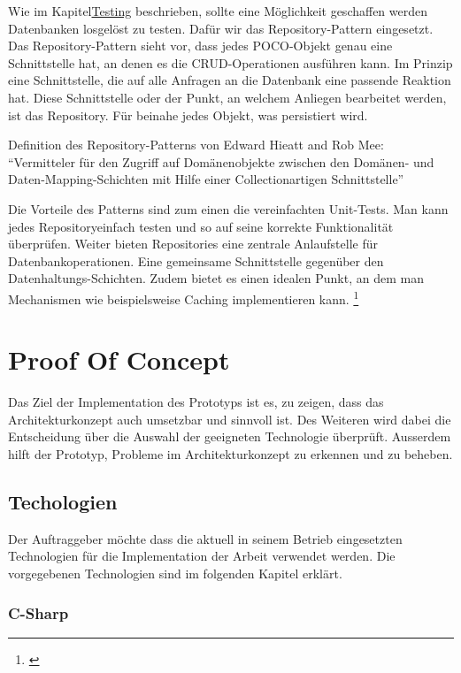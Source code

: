 Wie im Kapitel\protect\hyperlink{testing-1}{Testing} beschrieben, sollte
eine Möglichkeit geschaffen werden Datenbanken losgelöst zu testen.
Dafür wir das Repository-Pattern eingesetzt. Das Repository-Pattern
sieht vor, dass jedes POCO-Objekt genau eine Schnittstelle hat, an denen
es die CRUD-Operationen ausführen kann. Im Prinzip eine Schnittstelle,
die auf alle Anfragen an die Datenbank eine passende Reaktion hat. Diese
Schnittstelle oder der Punkt, an welchem Anliegen bearbeitet werden, ist
das Repository. Für beinahe jedes Objekt, was persistiert wird.

Definition des Repository-Patterns von Edward Hieatt and Rob Mee:
``Vermitteler für den Zugriff auf Domänenobjekte zwischen den Domänen-
und Daten-Mapping-Schichten mit Hilfe einer Collectionartigen
Schnittstelle''

Die Vorteile des Patterns sind zum einen die vereinfachten Unit-Tests.
Man kann jedes Repositoryeinfach testen und so auf seine korrekte
Funktionalität überprüfen. Weiter bieten Repositories eine zentrale
Anlaufstelle für Datenbankoperationen. Eine gemeinsame Schnittstelle
gegenüber den Datenhaltungs-Schichten. Zudem bietet es einen idealen
Punkt, an dem man Mechanismen wie beispielsweise Caching implementieren
kann. \footnote{\autocite{repository}}

\chapter{Proof Of Concept}\label{proof-of-concept}

Das Ziel der Implementation des Prototyps ist es, zu zeigen, dass das
Architekturkonzept auch umsetzbar und sinnvoll ist. Des Weiteren wird
dabei die Entscheidung über die Auswahl der geeigneten Technologie
überprüft. Ausserdem hilft der Prototyp, Probleme im Architekturkonzept
zu erkennen und zu beheben.

\section{Techologien}\label{techologien}

Der Auftraggeber möchte dass die aktuell in seinem Betrieb eingesetzten
Technologien für die Implementation der Arbeit verwendet werden. Die
vorgegebenen Technologien sind im folgenden Kapitel erklärt.

\subsection{C-Sharp}\label{c-sharp}

